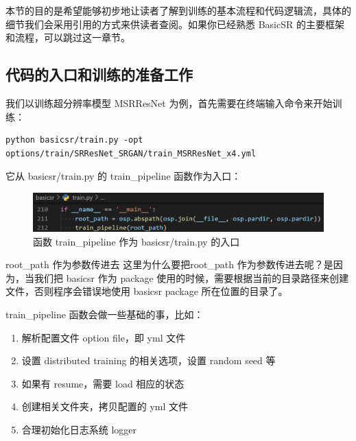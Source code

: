 \documentclass[../main.tex]{subfiles}
\begin{document}
本节的目的是希望能够初步地让读者了解到训练的基本流程和代码逻辑流，具体的细节我们会采用引用的方式来供读者查阅。如果你已经熟悉 BasicSR 的主要框架和流程，可以跳过这一章节。

\subsection{代码的入口和训练的准备工作}
我们以训练超分辨率模型 MSRResNet 为例，首先需要在终端输入命令来开始训练：

\begin{verbatim}
python basicsr/train.py -opt options/train/SRResNet_SRGAN/train_MSRResNet_x4.yml
\end{verbatim}

它从 basicsr/train.py 的 train\_pipeline 函数作为入口：

\begin{figure}[h]
    \begin{center}
        \vspace{-0.2cm}
        \includegraphics[width=0.9\linewidth]{figures/getting_start_train_entracne.png}
        \vspace{-0.3cm}
        \caption{函数 train\_pipeline 作为 basicsr/train.py 的入口}
        \label{fig:getting_start_train_entracne}
    \end{center}
    \vspace{-0.5cm}
\end{figure}

\begin{exampleBox}[righthand ratio=0.00, sidebyside, sidebyside align=center, lower separated=false]{root\_path 作为参数传进去}
    这里为什么要把root\_path 作为参数传进去呢？是因为，当我们把 basicsr 作为 package 使用的时候，需要根据当前的目录路径来创建文件，否则程序会错误地使用 basicsr package 所在位置的目录了。
\end{exampleBox}

train\_pipeline 函数会做一些基础的事，比如：
\begin{enumerate}
    \item 解析配置文件 option file，即 yml 文件
    \item 设置 distributed training 的相关选项，设置 random seed 等
    \item 如果有 resume，需要 load 相应的状态
    \item 创建相关文件夹，拷贝配置的 yml 文件
    \item 合理初始化日志系统 logger
\end{enumerate}
\end{document}
